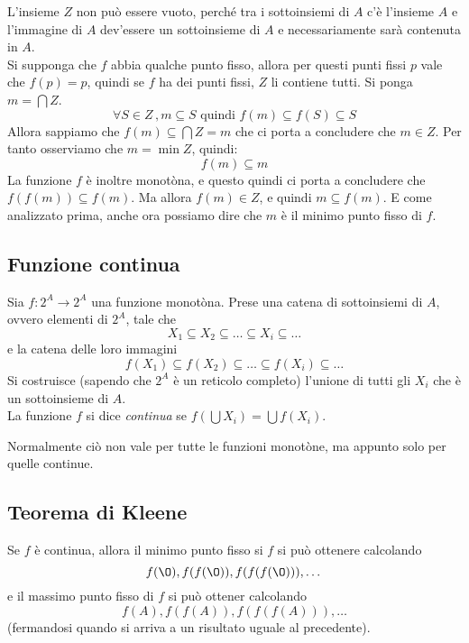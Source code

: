 L’insieme $Z$ non può essere vuoto, perché tra i sottoinsiemi di $A$ c’è l’insieme $A$ e l’immagine di $A$ dev’essere un sottoinsieme di $A$ e necessariamente sarà contenuta in $A$.\\

Si supponga che $f$ abbia qualche punto fisso, allora per questi punti fissi $p$ vale che $f(p)=p$, quindi se $f$ ha dei punti fissi, $Z$ li contiene tutti.
Si ponga $m = \bigcap Z$.
\[\forall S \in Z \,, m \subseteq S \mbox{ quindi }f(m) \subseteq f(S) \subseteq S\]
Allora sappiamo che $f(m) \subseteq \bigcap Z = m$ che ci porta a concludere che $m \in Z$. Per tanto osserviamo che $m = \min Z$, quindi:
\[f(m) \subseteq m\]
La funzione $f$ è inoltre monotòna, e questo quindi ci porta a concludere che $f(f(m)) \subseteq f(m)$. Ma allora $f(m) \in Z$, e quindi $m \subseteq f(m)$. E come analizzato prima, anche ora possiamo dire che $m$ è il minimo punto fisso di $f$.

\subsection{Funzione continua}
Sia $f : 2^A \to 2^A$ una funzione monotòna. Prese una catena di sottoinsiemi di $A$, ovvero elementi di $2^A$, tale che 
\[X_1 \subseteq X_2 \subseteq \dots \subseteq X_i \subseteq \dots\]  
e la catena delle loro immagini \[f(X_1) \subseteq f(X_2) \subseteq \dots \subseteq f(X_i) \subseteq \dots\] 
Si costruisce (sapendo che $2^A$ è un reticolo completo) l’unione di tutti gli $X_i$ che è un sottoinsieme di $A$.\\
La funzione $f$ si dice \textit{continua} se $f(\bigcup X_i) = \bigcup f(X_i)$.

Normalmente ciò non vale per tutte le funzioni monotòne, ma appunto solo per quelle continue.

\subsection{Teorema di Kleene}
Se $f$ è continua, allora il minimo punto fisso si $f$ si può ottenere calcolando \[f(\O), f(f(\O)), f(f(f(\O))), \dots\] 
e il massimo punto fisso di $f$ si può ottener calcolando \[f(A), f(f(A)), f(f(f(A))), \dots\] (fermandosi quando si arriva a un risultato uguale al precedente).
